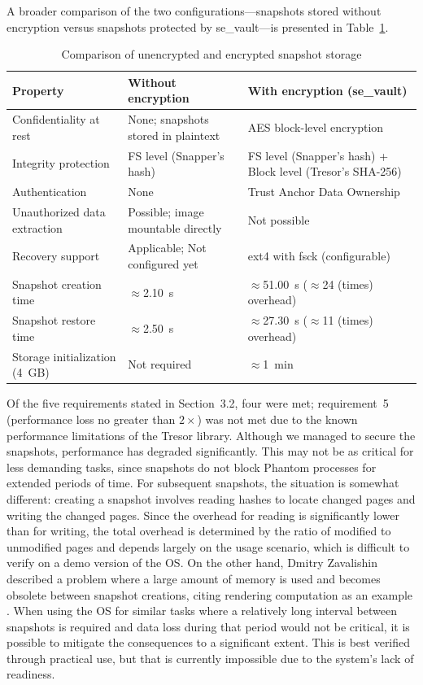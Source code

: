 A broader comparison of the two configurations---snapshots stored without encryption versus snapshots protected by se\_vault---is presented in Table~\ref{tab:solution_comparison}.

\begin{table}[H]
\centering
\caption{Comparison of unencrypted and encrypted snapshot storage}
\label{tab:solution_comparison}
\begin{tabular}{|p{4.0cm}|p{5.0cm}|p{5.0cm}|}
\toprule
\textbf{Property} & \textbf{Without encryption} & \textbf{With encryption (se\_vault)} \\
\midrule
Confidentiality at rest & None; snapshots stored in plaintext & AES block-level encryption \\
\midrule
Integrity protection & FS level (Snapper's hash) & FS level (Snapper's hash) + Block level (Tresor's SHA-256) \\
\midrule
Authentication & None & Trust Anchor Data Ownership \\
\midrule
Unauthorized data extraction & Possible; image mountable directly & Not possible \\
\midrule
Recovery support & Applicable; Not configured yet & ext4 with fsck (configurable) \\
\midrule
Snapshot creation time & $\approx$2.10~s & $\approx$51.00~s ($\approx$24 (times) overhead) \\
\midrule
Snapshot restore time & $\approx$2.50~s & $\approx$27.30~s ($\approx$11 (times) overhead) \\
\midrule
Storage initialization (4~GB) & Not required & $\approx$1~min \\
\bottomrule
\end{tabular}
\end{table}

Of the five requirements stated in Section~3.2, four were met; requirement~5 (performance loss no greater than $2\times$) was not met due to the known performance limitations of the Tresor library. Although we managed to secure the snapshots, performance has degraded significantly. This may not be as critical for less demanding tasks, since snapshots do not block Phantom processes for extended periods of time. For subsequent snapshots, the situation is somewhat different: creating a snapshot involves reading hashes to locate changed pages and writing the changed pages. Since the overhead for reading is significantly lower than for writing, the total overhead is determined by the ratio of modified to unmodified pages and depends largely on the usage scenario, which is difficult to verify on a demo version of the OS. On the other hand, Dmitry Zavalishin described a problem where a large amount of memory is used and becomes obsolete between snapshot creations, citing rendering computation as an example \cite{Habr_GC2}. When using the OS for similar tasks where a relatively long interval between snapshots is required and data loss during that period would not be critical, it is possible to mitigate the consequences to a significant extent. This is best verified through practical use, but that is currently impossible due to the system’s lack of readiness.

